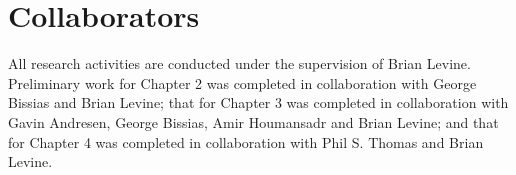 \paragraph*{}

\paragraph*{}


\section*{Collaborators}
All research activities are conducted under the supervision of Brian Levine. Preliminary work for Chapter 2 was completed in collaboration with George Bissias and Brian Levine; that for Chapter 3 was completed in collaboration with Gavin Andresen, George Bissias, Amir Houmansadr and Brian Levine; and that for Chapter 4 was completed in collaboration with Phil S. Thomas and Brian Levine.